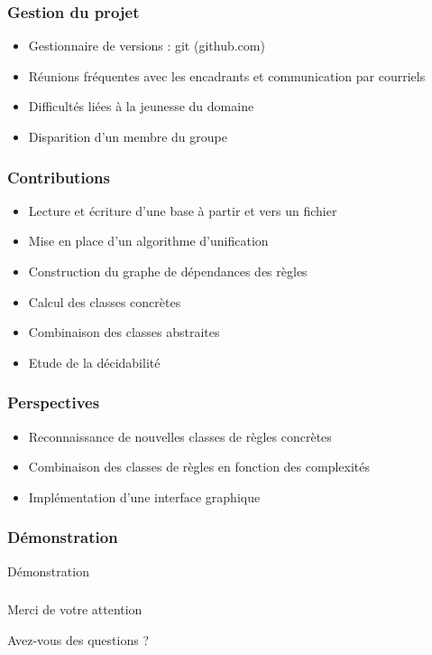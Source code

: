 
\begin{frame}
	\frametitle{Gestion du projet}
	\begin{itemize}
		\item Gestionnaire de versions : git (github.com)
		\item Réunions fréquentes avec les encadrants et communication par courriels
		\vspace{10mm}
		\item Difficultés liées à la jeunesse du domaine
		\item Disparition d'un membre du groupe
	\end{itemize}
\end{frame}

\begin{frame}
	\frametitle{Contributions}
	\begin{itemize}
		\item Lecture et écriture d'une base à partir et vers un fichier
		\item Mise en place d'un algorithme d'unification
		\item Construction du graphe de dépendances des règles
		\item Calcul des classes concrètes
		\item Combinaison des classes abstraites
		\item Etude de la décidabilité
	\end{itemize}
\end{frame}

\begin{frame}
	\frametitle{Perspectives}
	\begin{itemize}
		\item Reconnaissance de nouvelles classes de règles concrètes
		\item Combinaison des classes de règles en fonction des complexités
		\item Implémentation d'une interface graphique
	\end{itemize}
\end{frame}

\begin{frame}
	\frametitle{Démonstration}
	\begin{center}
	Démonstration
	\end{center}
\end{frame}

\begin{frame}
	\frametitle{}
	\begin{center}
	Merci de votre attention
	
	Avez-vous des questions ?
	\end{center}
\end{frame}

